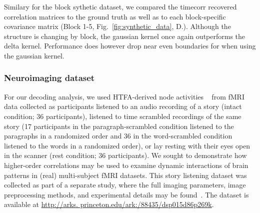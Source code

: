 \documentclass[english]{article}
\begin{document}
Similary for the block sythetic dataset, we compared the timecorr
recovered correlation matrices to the ground truth as well as to each
block-specific covariance matrix (Block 1-5,
Fig.~\ref{fig:synthetic_data},  D.).  Although the structure is
changing by block, the gaussian kernel once again outperforms the
delta kernel.  Performance does however drop near even boundaries for
when using the gaussian kernel. 


\subsubsection*{Neuroimaging dataset~\citep{SimoEtal16}}
For our decoding analysis, we used HTFA-derived node activities
~\cite{MannEtal18} from fMRI data collected as participants listened
to an audio recording of a story (intact condition; 36 participants),
listened to time scrambled recordings of the same story (17
participants in the paragraph-scrambled condition listened to the
paragraphs in a randomized order and 36 in the word-scrambled
condition listened to the words in a randomized order), or lay resting
with their eyes open in the scanner (rest condition; 36
participants). We sought to demonstrate how higher-order correlations
may be used to examine dynamic interactions of brain patterns in
(real) multi-subject fMRI datasets. This story listening dataset was
collected as part of a separate study, where the full imaging
parameters, image preprocessing methods, and experimental details may
be found~\citep{SimoEtal16}. The dataset is available at
\href{url}{http://arks. princeton.edu/ark:/88435/dsp015d86p269k}.
\end{document}

